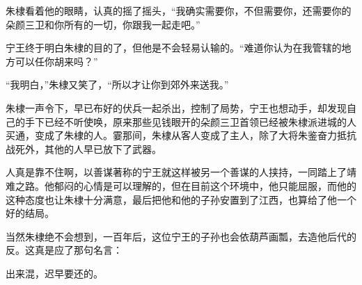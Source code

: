 \begin{multicols}{\theparacolNo}
		朱棣看着他的眼睛，认真的摇了摇头，“我确实需要你，不但需要你，还需要你的朵颜三卫和你所有的一切，你跟我一起走吧。”

		宁王终于明白朱棣的目的了，但他是不会轻易认输的。“难道你认为在我管辖的地方可以任你胡来吗？”

		“我明白，”朱棣又笑了，“所以才让你到郊外来送我。”

		朱棣一声令下，早已布好的伏兵一起杀出，控制了局势，宁王也想动手，却发现自己的手下已经不听使唤，原来那些见钱眼开的朵颜三卫首领已经被朱棣派进城的人买通，变成了朱棣的人。霎那间，朱棣从客人变成了主人，除了大将朱鉴奋力抵抗战死外，其他的人早已放下了武器。

		人真是靠不住啊，以善谋著称的宁王就这样被另一个善谋的人挟持，一同踏上了靖难之路。他郁闷的心情是可以理解的，但在目前这个环境中，他只能屈服，而他的这种态度也让朱棣十分满意，最后把他和他的子孙安置到了江西，也算给了他一个好的结局。

		当然朱棣绝不会想到，一百年后，这位宁王的子孙也会依葫芦画瓢，去造他后代的反。这真是应了那句名言：

		出来混，迟早要还的。
		\ifnum{}
	\end{multicols}
\fi
\newpage
